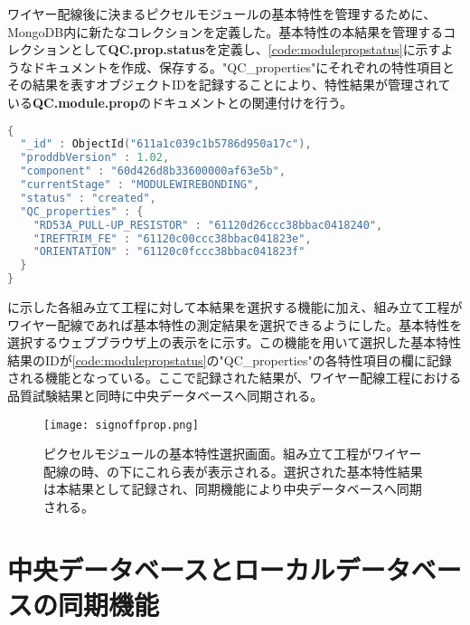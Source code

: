 ワイヤー配線後に決まるピクセルモジュールの基本特性を管理するために、MongoDB内に新たなコレクションを定義した。基本特性の本結果を管理するコレクションとして\textbf{QC.prop.status}を定義し、\cref{code:modulepropstatus}に示すようなドキュメントを作成、保存する。"QC\_properties"にそれぞれの特性項目とその結果を表すオブジェクトIDを記録することにより、特性結果が管理されている\textbf{QC.module.prop}のドキュメントとの関連付けを行う。


\begin{lstlisting}[caption=ピクセルモジュールの組み立て工程を管理するためのドキュメントの一部。,label=code:modulepropstatus, language=C++]
{
  "_id" : ObjectId("611a1c039c1b5786d950a17c"),
  "proddbVersion" : 1.02,
  "component" : "60d426d8b33600000af63e5b",
  "currentStage" : "MODULEWIREBONDING",
  "status" : "created",
  "QC_properties" : {
    "RD53A_PULL-UP_RESISTOR" : "61120d26ccc38bbac0418240",
    "IREFTRIM_FE" : "61120c00ccc38bbac041823e",
    "ORIENTATION" : "61120c0fccc38bbac041823f"
  }
}
\end{lstlisting}

に示した各組み立て工程に対して本結果を選択する機能に加え、組み立て工程がワイヤー配線であれば基本特性の測定結果を選択できるようにした。基本特性を選択するウェブブラウザ上の表示をに示す。この機能を用いて選択した基本特性結果のIDが\cref{code:modulepropstatus}の"QC\_properties"の各特性項目の欄に記録される機能となっている。ここで記録された結果が、ワイヤー配線工程における品質試験結果と同時に中央データベースへ同期される。

\begin{figure}[tbp]
  \centering
  \texttt{[image: signoffprop.png]}
  \caption[ピクセルモジュールの基本特性選択画面]{ピクセルモジュールの基本特性選択画面。組み立て工程がワイヤー配線の時、の下にこれら表が表示される。選択された基本特性結果は本結果として記録され、同期機能により中央データベースへ同期される。}
  \label{fig:sign-off-prop}
\end{figure}

\section{中央データベースとローカルデータベースの同期機能}
\label{sec:douki}

